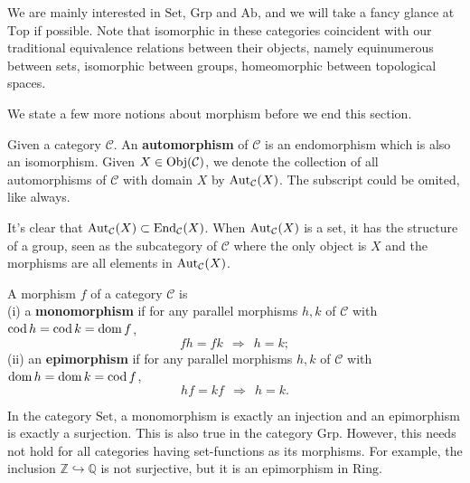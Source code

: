 We are mainly interested in $\mathrm{Set}$, $\mathrm{Grp}$ and $\mathrm{Ab}$, and we will take a fancy glance at $\mathrm{Top}$ if possible. Note that isomorphic in these categories coincident with our traditional equivalence relations between their objects, namely equinumerous between sets, isomorphic between groups, homeomorphic between topological spaces.\par
We state a few more notions about morphism before we end this section.
	\begin{definition}[Automorphism]
	Given a category $\mathcal{C}$. An \textbf{automorphism} of $\mathcal{C}$ is an endomorphism which is also an isomorphism. Given $X\in\operatorname{Obj}(\mathcal{C})$, we denote the collection of all automorphisms of $\mathcal{C}$ with domain $X$ by $\operatorname{Aut}_\mathcal{C}(X)$. The subscript could be omited, like always.
	\end{definition}
It's clear that $\operatorname{Aut}_\mathcal{C}(X)\subset \operatorname{End}_\mathcal{C}(X)$. When $\operatorname{Aut}_\mathcal{C}(X)$ is a set, it has the structure of a group, seen as the subcategory of $\mathcal{C}$ where the only object is $X$ and the morphisms are all elements in $\operatorname{Aut}_\mathcal{C}(X)$.
	\begin{definition}
	A morphism $f$ of a category $\mathcal{C}$ is \\
	(i) a \textbf{monomorphism} if for any parallel morphisms $h,k$ of $\mathcal{C}$ with $\operatorname{cod} h=\operatorname{cod} k=\operatorname{dom} f$,
	\[fh=fk\ \ \Rightarrow\ \ h=k;\]
	(ii) an \textbf{epimorphism} if for any parallel morphisms $h,k$ of $\mathcal{C}$ with $\operatorname{dom} h=\operatorname{dom} k=\operatorname{cod} f$, 
	\[hf=kf\ \ \Rightarrow\ \ h=k.\]
	\end{definition}
In the category $\mathrm{Set}$, a monomorphism is exactly an injection and an epimorphism is exactly a surjection. This is also true in the category $\mathrm{Grp}$. However, this needs not hold for all categories having set-functions as its morphisms. For example, the inclusion $\mathbb{Z}\hookrightarrow \mathbb{Q}$ is not surjective, but it is an epimorphism in $\mathrm{Ring}$.